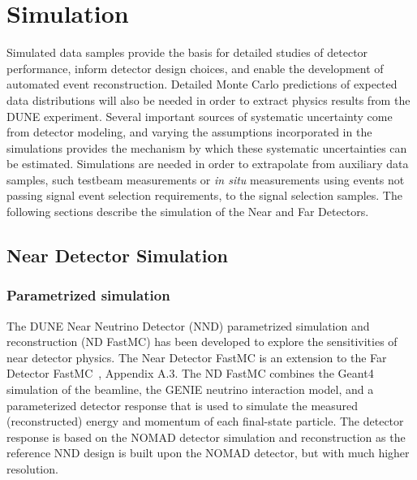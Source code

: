 \chapter{Simulation}
\label{annex:detectors-sc-physics-software-simulation}

Simulated data samples provide the basis for detailed studies of detector performance, inform
detector design choices,  and enable the development of automated event reconstruction.
Detailed Monte Carlo predictions of expected data distributions will also be needed
in order to extract physics results from the DUNE experiment.   Several important sources
of systematic uncertainty come from detector modeling, and varying the assumptions incorporated
in the simulations provides the mechanism by which these systematic uncertainties can be estimated.
Simulations are needed in order
to extrapolate from auxiliary data samples, such testbeam measurements or {\it in situ} measurements
using events not passing signal event selection requirements, to the signal selection samples.
The following sections describe the simulation of the Near and Far Detectors.

\section{Near Detector Simulation}
\label{annex:detectors-sc-physics-software-simulation-nd}
\subsection{Parametrized simulation}
The DUNE Near Neutrino Detector (NND) parametrized simulation and reconstruction (ND FastMC) has been
developed to explore the sensitivities of near detector physics. The Near Detector FastMC is an
extension to the Far Detector FastMC~\cite{Adams:2013qkq}, Appendix A.3. The ND FastMC combines
the Geant4 simulation of the beamline, the GENIE neutrino interaction model, and a parameterized
detector response that is used to simulate the measured (reconstructed) energy and momentum of each
final-state particle. The detector response is based on the NOMAD detector simulation and reconstruction
as the reference NND design is built upon the NOMAD detector, but with much higher resolution.

